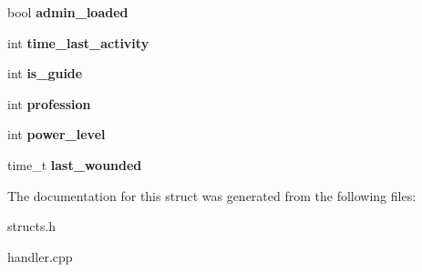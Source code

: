 \begin{DoxyCompactItemize}
\item 
\hypertarget{structpc__data_a364a4e2dcd67502d6194922df3840604}{bool {\bfseries admin\-\_\-loaded}}\label{structpc__data_a364a4e2dcd67502d6194922df3840604}

\item 
\hypertarget{structpc__data_a1eb8fa8d7bf5c64bf384af8de0757f69}{int {\bfseries time\-\_\-last\-\_\-activity}}\label{structpc__data_a1eb8fa8d7bf5c64bf384af8de0757f69}

\item 
\hypertarget{structpc__data_a32cdca3326c4568531754216eac44f4b}{int {\bfseries is\-\_\-guide}}\label{structpc__data_a32cdca3326c4568531754216eac44f4b}

\item 
\hypertarget{structpc__data_ac8e0800801facdaba67427dd7d3509a6}{int {\bfseries profession}}\label{structpc__data_ac8e0800801facdaba67427dd7d3509a6}

\item 
\hypertarget{structpc__data_a76732417756ca8254fee6dd7bd636bad}{int {\bfseries power\-\_\-level}}\label{structpc__data_a76732417756ca8254fee6dd7bd636bad}

\item 
\hypertarget{structpc__data_a4c345108162ff99c011c28348ea42c83}{time\-\_\-t {\bfseries last\-\_\-wounded}}\label{structpc__data_a4c345108162ff99c011c28348ea42c83}

\end{DoxyCompactItemize}


The documentation for this struct was generated from the following files\-:\begin{DoxyCompactItemize}
\item 
structs.\-h\item 
handler.\-cpp\end{DoxyCompactItemize}
